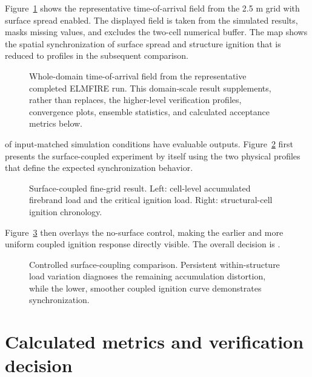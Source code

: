Figure~\ref{fig:domain-result} shows the representative time-of-arrival field from the 2.5 m grid with surface spread enabled.
The displayed field is taken from the simulated results, masks missing values, and excludes
the two-cell numerical buffer.  The map shows the spatial synchronization of surface spread and structure ignition that is reduced to profiles in the subsequent comparison.

\begin{figure}[H]
\centering
{}
\caption{Whole-domain time-of-arrival field from the representative completed ELMFIRE run.  This
domain-scale result supplements, rather than replaces, the higher-level verification
profiles, convergence plots, ensemble statistics, and calculated acceptance metrics below.}
\label{fig:domain-result}
\end{figure}

\CompletedVariantCount{} of \RequestedVariantCount{} input-matched
simulation conditions have evaluable outputs. Figure~\ref{fig:wsc-reference} first presents
the surface-coupled experiment by itself using the two physical profiles that
define the expected synchronization behavior.

\begin{figure}[H]
\centering
{}
\caption{Surface-coupled fine-grid result. Left: cell-level accumulated
firebrand load and the critical ignition load. Right: structural-cell ignition
chronology.}
\label{fig:wsc-reference}
\end{figure}

Figure~\ref{fig:wsc-comparison} then overlays the no-surface control, making the
earlier and more uniform coupled ignition response directly visible. The
overall decision is \textbf{\OverallStatus}.

\begin{figure}[H]
\centering
{}
\caption{Controlled surface-coupling comparison. Persistent within-structure
load variation diagnoses the remaining accumulation distortion, while the
lower, smoother coupled ignition curve demonstrates synchronization.}
\label{fig:wsc-comparison}
\end{figure}

\section{Calculated metrics and verification decision}

